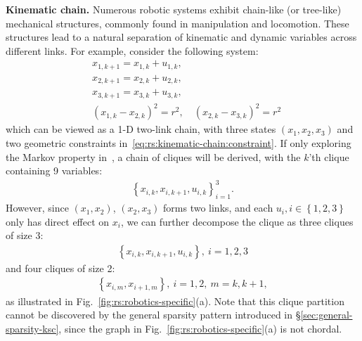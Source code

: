 \textbf{Kinematic chain.} Numerous robotic systems exhibit chain-like (or tree-like) mechanical structures, commonly found in manipulation and locomotion. These structures lead to a natural separation of kinematic and dynamic variables across different links. For example, consider the following system:
\begin{subequations} \label{eq:rs:kinematic-chain}
    \begin{align}
& x_{1,k+1} = x_{1,k} + u_{1,k}, \\
 &x_{2,k+1} = x_{2,k} + u_{2,k} , \\
 & x_{3,k+1} = x_{3,k} + u_{3,k} ,\\
        & (x_{1,k} - x_{2,k})^2 = r^2 , \quad (x_{2,k} - x_{3,k})^2 = r^2 \label{eq:rs:kinematic-chain:constraint}
    \end{align} 
\end{subequations}
which can be viewed as a 1-D two-link chain, with three states $(x_1, x_2, x_3)$ and two geometric constraints in~\eqref{eq:rs:kinematic-chain:constraint}. If only exploring the Markov property in~\cite{kang2024wafr-strom}, a chain of cliques will be derived, with the $k$'th clique containing 9 variables:
\begin{align}
    \left\{ x_{i,k}, x_{i,k+1}, u_{i,k} \right\}_{i=1}^3.
\end{align}
However, since $(x_1, x_2)$, $(x_2, x_3)$ forms two links, and each $u_i, i \in \left\{ 1,2,3 \right\}$ only has direct effect on $x_i$, we can further decompose the clique as three cliques of size 3:
\begin{align}
    \left\{ 
        x_{i,k}, x_{i,k+1}, u_{i,k}
    \right\}, \ i = 1,2,3
\end{align} 
and four cliques of size 2: 
\begin{align}
    \left\{ 
        x_{i,m}, x_{i+1,m}
     \right\}, \ i = 1,2, \ m = k, k+1,
\end{align}
as illustrated in Fig.~\ref{fig:rs:robotics-specific}(a). 
Note that this clique partition cannot be discovered by the general sparsity pattern introduced in \S\ref{sec:general-sparsity-ksc}, since the graph in Fig.~\ref{fig:rs:robotics-specific}(a) is not chordal. 

